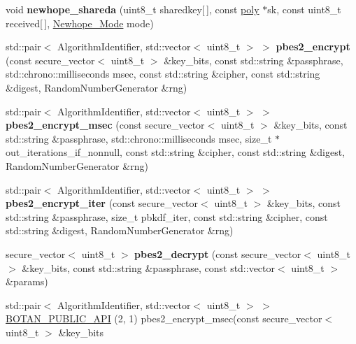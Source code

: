 \begin{DoxyCompactItemize}
\mbox{\label{namespace_botan_a9d06dbd7866aa3268a24a89c7b5d56a7}} 
void {\bfseries newhope\+\_\+shareda} (uint8\+\_\+t sharedkey\mbox{[}$\,$\mbox{]}, const \mbox{\hyperlink{class_botan_1_1newhope__poly}{poly}} $\ast$sk, const uint8\+\_\+t received\mbox{[}$\,$\mbox{]}, \mbox{\hyperlink{namespace_botan_a42a70d7cfb95e4f7773d3b52dc98ad61}{Newhope\+\_\+\+Mode}} mode)
\item 
\mbox{\label{namespace_botan_aa296e21a83107dbfd7d33a05976598fd}} 
std\+::pair$<$ Algorithm\+Identifier, std\+::vector$<$ uint8\+\_\+t $>$ $>$ {\bfseries pbes2\+\_\+encrypt} (const secure\+\_\+vector$<$ uint8\+\_\+t $>$ \&key\+\_\+bits, const std\+::string \&passphrase, std\+::chrono\+::milliseconds msec, const std\+::string \&cipher, const std\+::string \&digest, Random\+Number\+Generator \&rng)
\item 
\mbox{\label{namespace_botan_af740ed14057fc918d954be3c9846e327}} 
std\+::pair$<$ Algorithm\+Identifier, std\+::vector$<$ uint8\+\_\+t $>$ $>$ {\bfseries pbes2\+\_\+encrypt\+\_\+msec} (const secure\+\_\+vector$<$ uint8\+\_\+t $>$ \&key\+\_\+bits, const std\+::string \&passphrase, std\+::chrono\+::milliseconds msec, size\+\_\+t $\ast$out\+\_\+iterations\+\_\+if\+\_\+nonnull, const std\+::string \&cipher, const std\+::string \&digest, Random\+Number\+Generator \&rng)
\item 
\mbox{\label{namespace_botan_a1d0eb6721b79d35fec1c25fdabc259d0}} 
std\+::pair$<$ Algorithm\+Identifier, std\+::vector$<$ uint8\+\_\+t $>$ $>$ {\bfseries pbes2\+\_\+encrypt\+\_\+iter} (const secure\+\_\+vector$<$ uint8\+\_\+t $>$ \&key\+\_\+bits, const std\+::string \&passphrase, size\+\_\+t pbkdf\+\_\+iter, const std\+::string \&cipher, const std\+::string \&digest, Random\+Number\+Generator \&rng)
\item 
\mbox{\label{namespace_botan_a0d487947d7dcf39c8a546f4843acb153}} 
secure\+\_\+vector$<$ uint8\+\_\+t $>$ {\bfseries pbes2\+\_\+decrypt} (const secure\+\_\+vector$<$ uint8\+\_\+t $>$ \&key\+\_\+bits, const std\+::string \&passphrase, const std\+::vector$<$ uint8\+\_\+t $>$ \&params)
\item 
std\+::pair$<$ Algorithm\+Identifier, std\+::vector$<$ uint8\+\_\+t $>$ $>$ \mbox{\hyperlink{namespace_botan_a8936d9d14b59d25507d664d4e631b605}{B\+O\+T\+A\+N\+\_\+\+P\+U\+B\+L\+I\+C\+\_\+\+A\+PI}} (2, 1) pbes2\+\_\+encrypt\+\_\+msec(const secure\+\_\+vector$<$ uint8\+\_\+t $>$ \&key\+\_\+bits

\end{DoxyCompactItemize}
